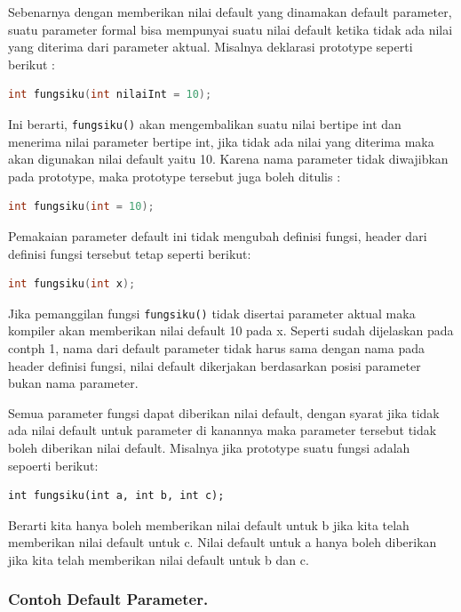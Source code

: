 Sebenarnya dengan memberikan nilai default yang dinamakan default
parameter, suatu parameter formal bisa mempunyai suatu nilai default
ketika tidak ada nilai yang diterima dari parameter aktual. Misalnya
deklarasi prototype seperti berikut :

\begin{lstlisting}[language=c++, numbers=none]
int fungsiku(int nilaiInt = 10);  
\end{lstlisting}

Ini berarti, \texttt{fungsiku()} akan mengembalikan suatu nilai bertipe
int dan menerima nilai parameter bertipe int, jika tidak ada nilai yang
diterima maka akan digunakan nilai default yaitu 10. Karena nama
parameter tidak diwajibkan pada prototype, maka prototype tersebut juga
boleh ditulis :

\begin{lstlisting}[language=c++, numbers=none]
int fungsiku(int = 10);  
\end{lstlisting}

Pemakaian parameter default ini tidak mengubah definisi fungsi, header
dari definisi fungsi tersebut tetap seperti berikut:

\begin{lstlisting}[language=c++, numbers=none]
int fungsiku(int x);  
\end{lstlisting}

Jika pemanggilan fungsi \texttt{fungsiku()} tidak disertai parameter
aktual maka kompiler akan memberikan nilai default 10 pada x. Seperti
sudah dijelaskan pada contph 1, nama dari default parameter tidak harus
sama dengan nama pada header definisi fungsi, nilai default dikerjakan
berdasarkan posisi parameter bukan nama parameter.

Semua parameter fungsi dapat diberikan nilai default, dengan syarat jika
tidak ada nilai default untuk parameter di kanannya maka parameter
tersebut tidak boleh diberikan nilai default. Misalnya jika prototype
suatu fungsi adalah sepoerti berikut:

\begin{lstlisting}
int fungsiku(int a, int b, int c);  
\end{lstlisting}

Berarti kita hanya boleh memberikan nilai default untuk b jika kita
telah memberikan nilai default untuk c. Nilai default untuk a hanya
boleh diberikan jika kita telah memberikan nilai default untuk b dan c.

\subsubsection*{Contoh Default Parameter.}

